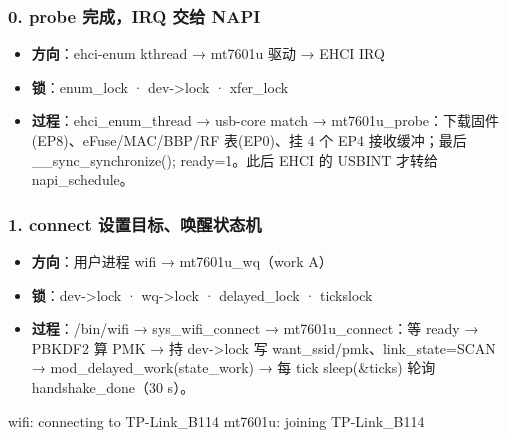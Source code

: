\documentclass[UTF8,zihao=-4,fontset=none]{ctexart}
\begin{document}
\subsubsection*{0. probe 完成，IRQ 交给 NAPI}
\begin{itemize}[leftmargin=2em,itemsep=1pt]
\item \textbf{方向}：ehci-enum kthread → mt7601u 驱动 → EHCI IRQ
\item \textbf{锁}：enum\_lock · dev->lock · xfer\_lock
\item \textbf{过程}：ehci\_enum\_thread → usb-core match → mt7601u\_probe：下载固件(EP8)、eFuse/MAC/BBP/RF 表(EP0)、挂 4 个 EP4 接收缓冲；最后 \_\_sync\_synchronize(); ready=1。此后 EHCI 的 USBINT 才转给 napi\_schedule。
\end{itemize}

\subsubsection*{1. connect 设置目标、唤醒状态机}
\begin{itemize}[leftmargin=2em,itemsep=1pt]
\item \textbf{方向}：用户进程 wifi → mt7601u\_wq（work A）
\item \textbf{锁}：dev->lock · wq->lock · delayed\_lock · tickslock
\item \textbf{过程}：/bin/wifi → sys\_wifi\_connect → mt7601u\_connect：等 ready → PBKDF2 算 PMK → 持 dev->lock 写 want\_ssid/pmk、link\_state=SCAN → mod\_delayed\_work(state\_work) → 每 tick sleep(\&ticks) 轮询 handshake\_done（30 s）。
\end{itemize}
\begin{logv}
wifi: connecting to TP-Link_B114
mt7601u: joining TP-Link_B114
\end{logv}
\end{document}
